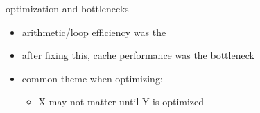 \begin{frame}{optimization and bottlenecks}
    \begin{itemize}
        \item arithmetic/loop efficiency was the 
        \item after fixing this, cache performance was the bottleneck
            \vspace{.5cm}
        \item common theme when optimizing:
            \begin{itemize}
            \item X may not matter until Y is optimized
            \end{itemize}
    \end{itemize}
\end{frame}
